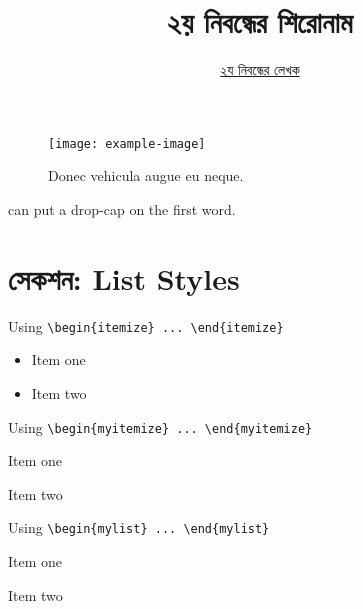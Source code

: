 \documentclass[12pt]{article}
\begin{document}

\title{২য় নিবন্ধের শিরোনাম}
\author{\href{https://github.com/rafisics/ebook-template}{২য় নিবন্ধের লেখক}}
\date{}


\begin{figure}[htbp]
        \centering
        \texttt{[image: example-image]}
        \caption{Donec vehicula augue eu neque.}
\end{figure}

 can put a drop-cap on the first word. \blindtext \\

\section*{সেকশন: List Styles}

Using \verb|\begin{itemize} ... \end{itemize}|
\begin{itemize}
        \item Item one
        \item Item two
\end{itemize}

Using \verb|\begin{myitemize} ... \end{myitemize}|
\begin{myitemize}
        \item Item one
        \item Item two
\end{myitemize}

Using \verb|\begin{mylist} ... \end{mylist}|
\begin{mylist}
        \item Item one
        \item Item two
\end{mylist}
\end{document}
